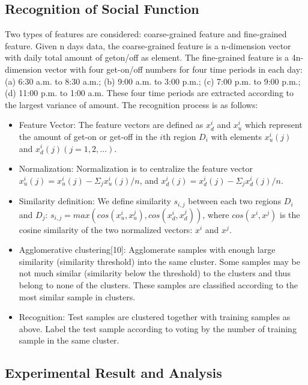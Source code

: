 \documentclass[a4paper, 10pt, conference]{ieeeconf}      %
\begin{document}
\subsection{Recognition of Social Function}Two types of features are considered: coarse-grained feature and fine-grained feature. Given n days data, the coarse-grained feature is a n-dimension vector with daily total amount of geton/off as element. The fine-grained feature is a 4n-dimension vector with four get-on/off numbers for four time periods in each day: (a) 6:30 a.m. to 8:30 a.m.; (b) 9:00 a.m. to 3:00 p.m.; (c) 7:00 p.m. to 9:00 p.m.; (d) 11:00 p.m. to 1:00 a.m. These four time periods are extracted according to the largest variance of amount. The recognition process is as follows:

\begin{itemize}

\item Feature Vector: The feature vectors are defined as $ x^{i}_{d} $ and $ x^{i}_{u} $ which represent the amount of get-on or get-off in the $i$th region $D_i$ with elements $ x^{i}_{u}(j) $ and $ x^{i}_{d}(j) (j=1,2,...) $.
\item Normalization: Normalization is to centralize the feature vector $ x^{i}_{u}(j)=x^{i}_{u}(j)-\Sigma_{j}x^{i}_{u}(j)/n $, and $ x^{i}_{d}(j)=x^{i}_{d}(j)-\Sigma_{j}x^{i}_{d}(j)/n $.
\item Similarity definition: We define similarity $ s_{i,j} $ between each two regions $ D_i $ and $ D_j $: $ s_{i,j}=max(cos(x^{i}_{u},x^{j}_{u}),cos(x^{i}_{d},x^{j}_{d})) $, where $ cos(x^i,x^j) $ is the cosine similarity of the two normalized vectors: $ x^i $ and $ x^j $.
\item Agglomerative clustering[10]: Agglomerate samples with enough large similarity (similarity threshold) into the same cluster. Some samples may be not much similar (similarity below the threshold) to the clusters and thus belong to none of the clusters. These samples are classified according to the most similar sample in clusters.
\item Recognition: Test samples are clustered together with training samples as above. Label the test sample according to voting by the number of training sample in the same cluster.

\end{itemize}

\subsection{Experimental Result and Analysis}
\end{document}
